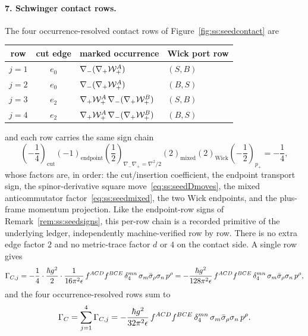 \paragraph{7. Schwinger contact rows.}
The four occurrence-resolved contact rows of
Figure~\ref{fig:ss:seedcontact} are
\begin{center}
\begin{tabular}{ccll}
\hline
row & cut edge & marked occurrence & Wick port row\\
\hline
$j=1$ & $e_0$ & $\nabla_{-}(\nabla_{+}\mathcal{W}_{+}^{A})$ & $(S,B)$\\
$j=2$ & $e_0$ & $\nabla_{-}(\nabla_{+}\mathcal{W}_{+}^{A})$ & $(B,S)$\\
$j=3$ & $e_2$ & $\nabla_{+}\mathcal{W}_{+}^{A}\,\nabla_{-}(\nabla_{+}\mathcal{W}_{+}^{B})$
& $(S,B)$\\
$j=4$ & $e_2$ & $\nabla_{+}\mathcal{W}_{+}^{A}\,\nabla_{-}(\nabla_{+}\mathcal{W}_{+}^{B})$
& $(B,S)$\\
\hline
\end{tabular}
\end{center}
and each row carries the same sign chain
\begin{equation}\label{eq:ss:signchain}
\left(-\frac14\right)_{\mathrm{cut}}
(-1)_{\mathrm{endpoint}}
\left(\frac12\right)_{\nabla_{-}\nabla_{+}=\nabla^{2}/2}
(2)_{\mathrm{mixed}}
(2)_{\mathrm{Wick}}
\left(-\frac12\right)_{p_{+}}
=-\frac14 ,
\end{equation}
whose factors are, in order: the cut/insertion coefficient, the endpoint
transport sign, the spinor-derivative square
move~\eqref{eq:ss:seedDmoves}, the mixed anticommutator
factor~\eqref{eq:ss:seedmixed}, the two Wick endpoints, and the plus-frame
momentum projection. Like the endpoint-row signs of
Remark~\ref{rem:ss:seedsigns}, this per-row chain is a recorded primitive of
the underlying ledger, independently machine-verified row by row. There is no
extra edge factor $2$ and no metric-trace
factor $d$ or $4$ on the contact side. A single row gives
\begin{equation}\label{eq:ss:singlerow}
\Gamma_{C,j}
=-\frac14\cdot\frac{\hbar g^{2}}{2}\cdot\frac{1}{16\pi^{2}\epsilon}\,
f^{ACD}f^{BCE}\,\delta_4^{mn}\,
\sigma_m\bar\sigma_\rho\sigma_n\,p^{\rho}
=-\frac{\hbar g^{2}}{128\pi^{2}\epsilon}\,
f^{ACD}f^{BCE}\,\delta_4^{mn}\,
\sigma_m\bar\sigma_\rho\sigma_n\,p^{\rho} ,
\end{equation}
and the four occurrence-resolved rows sum to
\begin{equation}\label{eq:ss:contactrows}
\Gamma_{C}
=\sum_{j=1}^{4}\Gamma_{C,j}
=-\frac{\hbar g^{2}}{32\pi^{2}\epsilon}\,
f^{ACD}f^{BCE}\,\delta_4^{mn}\,
\sigma_m\bar\sigma_\rho\sigma_n\,p^{\rho} .
\end{equation}

